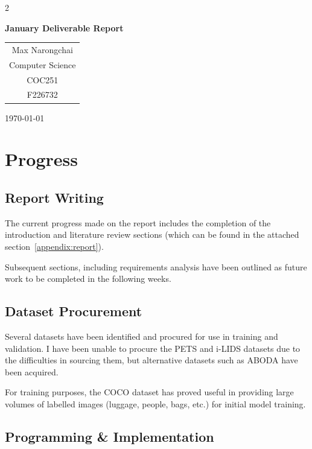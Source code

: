 \documentclass{article}
\begin{document}
\begin{multicols*}{2}

	{
		\centering
		{\LARGE{\bfseries January Deliverable Report}\\[6pt]}
		\vspace{.5cm}

		\begin{tabular}{c}
			\Large Max Narongchai \\ Computer Science \\ COC251 \\ F226732
		\end{tabular}
		\vspace{.5cm}

		{\small \today\par}
	}

	\section*{Progress}

	\subsection*{Report Writing}

	The current progress made on the report includes the completion of the
	introduction and literature review sections (which can be found in the attached
	section~\ref{appendix:report}).

	Subsequent sections, including requirements analysis have been outlined as
	future work to be completed in the following weeks.

	\subsection*{Dataset Procurement}

	Several datasets have been identified and procured for use in training and
	validation. I have been unable to procure the PETS and i-LIDS datasets due to
	the difficulties in sourcing them, but alternative datasets such as ABODA have
	been acquired.

	For training purposes, the COCO dataset has proved useful in providing large
	volumes of labelled images (luggage, people, bags, etc.) for initial model
	training.

	\subsection*{Programming \& Implementation}


\end{multicols*}
\end{document}
